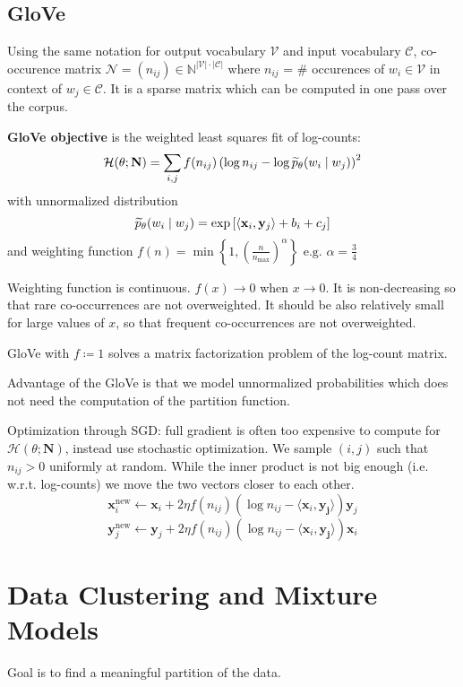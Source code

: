 \documentclass[12pt]{article}
\begin{document}
\subsection{GloVe}
\par Using the same notation for output vocabulary $\mathcal{V}$ and input vocabulary $\mathcal{C}$, co-occurence matrix $\mathcal{N} = (n_{ij})\in \mathbb{N}^{|\mathcal{V}|\cdot|\mathcal{C}|}$ where $n_{ij}$ = \# occurences of $w_i\in\mathcal{V}$ in context of $w_j\in\mathcal{C}$. It is a sparse matrix which can be computed in one pass over the corpus.
\par \textbf{GloVe objective} is the weighted least squares fit of log-counts:
\[ \mathcal{H}(\theta;\mathbf{N}) = \sum_{i,j} f(n_{ij}) \left( \log n_{ij} - \log \widetilde{p}_{\theta} (w_i\mid w_j) \right)^2 \]
with unnormalized distribution
\[ \widetilde{p}_{\theta} (w_i\mid w_j) = \exp\left[ \left\langle \mathbf{x}_i,\mathbf{y}_j \right\rangle + b_i + c_j \right] \]
and weighting function $f(n) = \min \left\{ 1, \left( \frac{n}{n_{\max}} \right)^{\alpha}  \right\} \text{ e.g. } \alpha = \frac{3}{4}  $
\par Weighting function is continuous. $f(x) \rightarrow 0$ when $x\rightarrow 0$. It is non-decreasing so that rare co-occurrences are not overweighted. It should be also relatively small for large values of $x$, so that frequent co-occurrences are not overweighted.
\par GloVe with $f\coloneqq 1$ solves a matrix factorization problem of the log-count matrix.
\par Advantage of the GloVe is that we model unnormalized probabilities which does not need the computation of the partition function.
\par Optimization through SGD: full gradient is often too expensive to compute for $\mathcal{H}(\theta;\mathbf{N})$, instead use stochastic optimization. We sample $(i,j)$ such that $n_{ij} > 0$ uniformly at random. While the inner product is not big enough (i.e. w.r.t. log-counts) we move the two vectors closer to each other.
\[ \mathbf{x}_i^{\text{new}} \leftarrow \mathbf{x}_i + 2\eta f(n_{ij})(\log n_{ij} - \langle \mathbf{x}_i , \mathbf{y_j} \rangle) \mathbf{y}_j \]
\[ \mathbf{y}_j^{\text{new}} \leftarrow \mathbf{y}_j + 2\eta f(n_{ij})(\log n_{ij} - \langle \mathbf{x}_i , \mathbf{y_j} \rangle) \mathbf{x}_i \]

\section{Data Clustering and Mixture Models}
Goal is to find a meaningful partition of the data.
\end{document}

